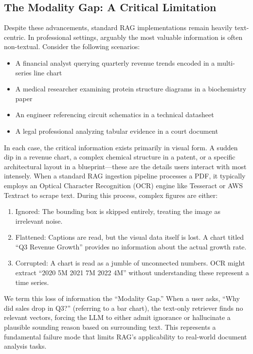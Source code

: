 \documentclass[conference]{IEEEtran}
\begin{document}
\subsection{The Modality Gap: A Critical Limitation}
Despite these advancements, standard RAG implementations remain heavily text-centric. In professional settings, arguably the most valuable information is often non-textual. Consider the following scenarios:
\begin{itemize}
    \item A financial analyst querying quarterly revenue trends encoded in a multi-series line chart
    \item A medical researcher examining protein structure diagrams in a biochemistry paper
    \item An engineer referencing circuit schematics in a technical datasheet
    \item A legal professional analyzing tabular evidence in a court document
\end{itemize}
In each case, the critical information exists primarily in visual form. A sudden dip in a revenue chart, a complex chemical structure in a patent, or a specific architectural layout in a blueprint—these are the details users interact with most intensely. When a standard RAG ingestion pipeline processes a PDF, it typically employs an Optical Character Recognition (OCR) engine like Tesseract or AWS Textract to scrape text. During this process, complex figures are either:
\begin{enumerate}
    \item Ignored: The bounding box is skipped entirely, treating the image as irrelevant noise.
    \item Flattened: Captions are read, but the visual data itself is lost. A chart titled ``Q3 Revenue Growth'' provides no information about the actual growth rate.
    \item Corrupted: A chart is read as a jumble of unconnected numbers. OCR might extract ``2020 5M 2021 7M 2022 4M'' without understanding these represent a time series.
\end{enumerate}
We term this loss of information the ``Modality Gap.'' When a user asks, ``Why did sales drop in Q3?'' (referring to a bar chart), the text-only retriever finds no relevant vectors, forcing the LLM to either admit ignorance or hallucinate a plausible sounding reason based on surrounding text. This represents a fundamental failure mode that limits RAG's applicability to real-world document analysis tasks.
\end{document}
